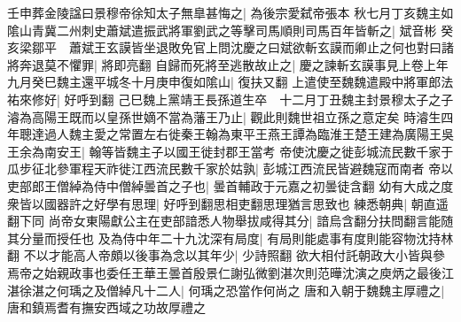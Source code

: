 壬申葬金陵諡曰景穆帝徐知太子無臯甚悔之|{
	為後宗愛弑帝張本}
秋七月丁亥魏主如隂山青冀二州刺史蕭斌遣振武將軍劉武之等擊司馬順則司馬百年皆斬之|{
	斌音彬}
癸亥梁鄒平　蕭斌王玄謨皆坐退敗免官上問沈慶之曰斌欲斬玄謨而卿止之何也對曰諸將奔退莫不懼罪|{
	將即亮翻}
自歸而死將至逃散故止之|{
	慶之諫斬玄謨事見上卷上年}
九月癸巳魏主還平城冬十月庚申復如隂山|{
	復扶又翻}
上遣使至魏魏遣殿中將軍郎法祐來修好|{
	好呼到翻}
己巳魏上黨靖王長孫道生卒　十二月丁丑魏主封景穆太子之子濬為高陽王既而以皇孫世嫡不當為藩王乃止|{
	觀此則魏世祖立孫之意定矣}
時濬生四年聰達過人魏主愛之常置左右徙秦王翰為東平王燕王譚為臨淮王楚王建為廣陽王吳王余為南安王|{
	翰等皆魏主子以國王徙封郡王當考}
帝使沈慶之徙彭城流民數千家于瓜步征北參軍程天祚徙江西流民數千家於姑孰|{
	彭城江西流民皆避魏寇而南者}
帝以吏部郎王僧綽為侍中僧綽曇首之子也|{
	曇首輔政于元嘉之初曇徒含翻}
幼有大成之度衆皆以國器許之好學有思理|{
	好呼到翻思相吏翻思理猶言思致也}
練悉朝典|{
	朝直遥翻下同}
尚帝女東陽獻公主在吏部諳悉人物舉拔咸得其分|{
	諳烏含翻分扶問翻言能随其分量而授任也}
及為侍中年二十九沈深有局度|{
	有局則能處事有度則能容物沈持林翻}
不以才能高人帝頗以後事為念以其年少|{
	少詩照翻}
欲大相付託朝政大小皆與參焉帝之始親政事也委任王華王曇首殷景仁謝弘微劉湛次則范曄沈演之庾炳之最後江湛徐湛之何瑀之及僧綽凡十二人|{
	何瑀之恐當作何尚之}
唐和入朝于魏魏主厚禮之|{
	唐和鎮焉耆有撫安西域之功故厚禮之}


